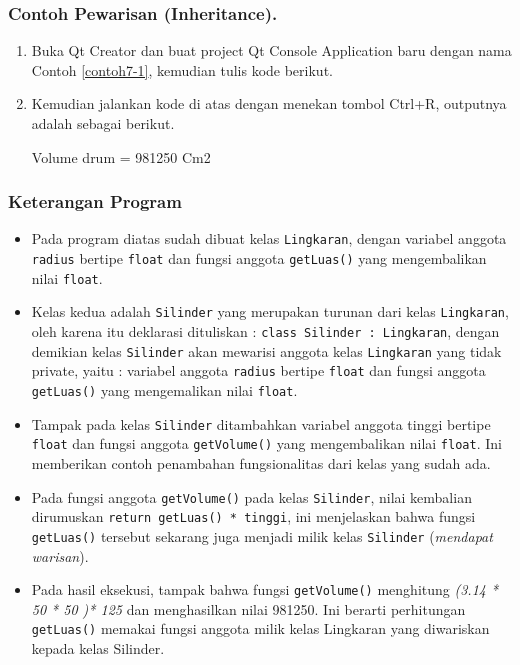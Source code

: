 \subsubsection*{Contoh Pewarisan (Inheritance).}

\begin{enumerate}
\item Buka Qt Creator dan buat project Qt Console Application baru dengan nama
Contoh \ref{contoh7-1}, kemudian tulis kode berikut.



\item Kemudian jalankan kode di atas dengan menekan tombol Ctrl+R, outputnya
adalah sebagai berikut.

\begin{lcverbatim}
Volume drum = 981250 Cm2
\end{lcverbatim}
\end{enumerate}

\subsubsection*{Keterangan Program}

\begin{itemize}

\item
  Pada program diatas sudah dibuat kelas \texttt{Lingkaran}, dengan
  variabel anggota \texttt{radius} bertipe \texttt{float} dan fungsi
  anggota \texttt{getLuas()} yang mengembalikan nilai \texttt{float}.
\item
  Kelas kedua adalah \texttt{Silinder} yang merupakan turunan dari kelas
  \texttt{Lingkaran}, oleh karena itu deklarasi dituliskan :
  \texttt{class\ Silinder\ :\ Lingkaran}, dengan demikian kelas
  \texttt{Silinder} akan mewarisi anggota kelas \texttt{Lingkaran} yang
  tidak private, yaitu : variabel anggota \texttt{radius} bertipe
  \texttt{float} dan fungsi anggota \texttt{getLuas()} yang mengemalikan
  nilai \texttt{float}.
\item
  Tampak pada kelas \texttt{Silinder} ditambahkan variabel anggota
  tinggi bertipe \texttt{float} dan fungsi anggota \texttt{getVolume()}
  yang mengembalikan nilai \texttt{float}. Ini memberikan contoh
  penambahan fungsionalitas dari kelas yang sudah ada.
\item
  Pada fungsi anggota \texttt{getVolume()} pada kelas \texttt{Silinder},
  nilai kembalian dirumuskan \texttt{return\ getLuas()\ *\ tinggi}, ini
  menjelaskan bahwa fungsi \texttt{getLuas()} tersebut sekarang juga
  menjadi milik kelas \texttt{Silinder} (\emph{mendapat warisan}).
\item
  Pada hasil eksekusi, tampak bahwa fungsi \texttt{getVolume()}
  menghitung \emph{(3.14 * 50 * 50 )* 125} dan menghasilkan nilai
  981250. Ini berarti perhitungan \texttt{getLuas()} memakai fungsi
  anggota milik kelas Lingkaran yang diwariskan kepada kelas Silinder.
\end{itemize}

